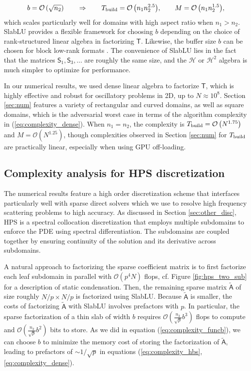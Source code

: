 \documentclass[11pt]{amsart}
\newcommand{\mtx}[1]{\bm{\mathsf{#1}}}
\begin{document}
\begin{equation}
b = \mathcal O \left(\sqrt {n_2} \right)\qquad \Rightarrow \qquad 
T_{\rm build} = {\mathcal O \left( n_1 n_2^{2.5} \right)},
\qquad M = {\mathcal O \left( n_1 n_2^{1.5} \right)},
\label{eq:complexity_dense}
\end{equation}
which scales particularly well for domains with high aspect ratio when $n_1 > n_2$. 
SlabLU provides a flexible framework for choosing $b$ depending on the choice of rank-structured linear algebra in factorizing $\mtx T$. Likewise, the buffer size $b$ can be chosen for block low-rank formats \cite{amestoy2017complexity}.
The convenience of SlabLU lies in the fact that the matrices $\mtx S_1,\mtx S_3, \dots$ are roughly the same size, and the $\mathcal H$ or $\mathcal H^2$ algebra is much simpler to optimize for performance.

In our numerical results, we used dense linear algebra to factorize $\mtx T$, which is highly
effective and robust for oscillatory problems in 2D, up to $N \approx 10^8$. Section \ref{sec:num} features a variety of rectangular and curved domains, as well as square domains, which is the adversarial worst case in terms of the algorithm complexity in (\ref{eq:complexity_dense}). When $n_1=n_2$, the complexity is
$T_{\rm build} = \mathcal O\left( N^{1.75} \right)$ and $ M = \mathcal O\left( N^{1.25} \right)$,
though complexities observed in Section \ref{sec:num} for $T_{\rm build}$ are practically linear, especially 
when using GPU off-loading.

\subsection{Complexity analysis for HPS discretization}
\label{sec:complexity_hps}

The numerical results feature a high order discretization scheme that interfaces particularly well with sparse direct solvers
which we use to resolve high frequency scattering problems to high accuracy.
As discussed in Section \ref{sec:other_disc}, HPS is a spectral collocation discretization that employs multiple subdomains
to enforce the PDE using spectral differentiation. The subdomains are coupled together by ensuring continuity of the solution 
and its derivative across subdomains. 

A natural approach to factorizing the sparse coefficient matrix is to first factorize each leaf subdomain in parallel
with $\mathcal O\left({p^4 N}\right)$ flops, cf. Figure \ref{fig:hps_two_sub} for a description of static condensation. 
Then, the remaining sparse matrix $\mtx {\tilde A}$ of size roughly $N/p \times N/p$ is factorized using SlabLU.
Because $\mtx{\tilde A}$ is smaller, the costs of factorizing $\mtx {\tilde A}$ with SlabLU involves prefactors with $p$.
In particular, the sparse factorization of a thin slab of width $b$ requires $\mathcal O \left({\frac{n_2}{\sqrt{p}} b^3} \right)$ flops to compute and $\mathcal O \left({\frac{n_2}{\sqrt{p}} b^2} \right)$ bits to store.
As we did in equation (\ref{eq:complexity_funcb}), we can choose $b$ to minimize the memory cost of storing the factorization of $\mtx {\tilde A}$, leading to prefactors of $\sim 1/\sqrt{p}$ in equations (\ref{eq:complexity_hbs}, \ref{eq:complexity_dense}).
\end{document}
